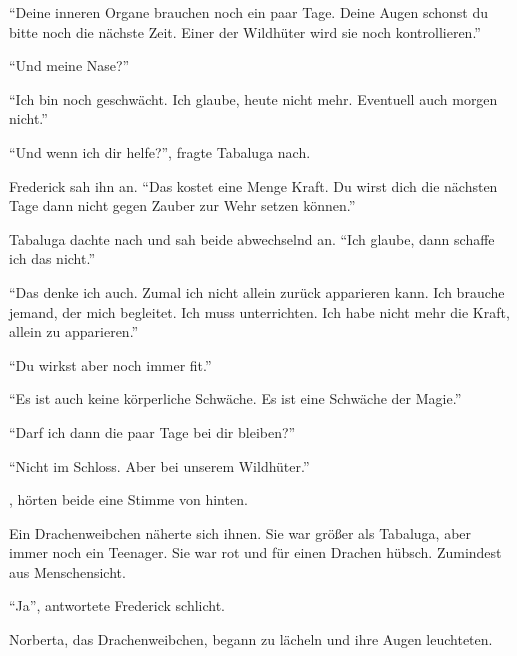 \enquote{Deine inneren Organe brauchen noch ein paar Tage. Deine Augen schonst du bitte noch die nächste Zeit. Einer der Wildhüter wird sie noch kontrollieren.}

\enquote{Und meine Nase?}

\enquote{Ich bin noch geschwächt. Ich glaube, heute nicht mehr. Eventuell auch morgen nicht.}

\enquote{Und wenn ich dir helfe?}, fragte Tabaluga nach.

Frederick sah ihn an. \enquote{Das kostet eine Menge Kraft. Du wirst dich die nächsten Tage dann nicht gegen Zauber zur Wehr setzen können.}

Tabaluga dachte nach und sah beide abwechselnd an. \enquote{Ich glaube, dann schaffe ich das nicht.}

\enquote{Das denke ich auch. Zumal ich nicht allein zurück apparieren kann. Ich brauche jemand, der mich begleitet. Ich muss unterrichten. Ich habe nicht mehr die Kraft, allein zu apparieren.}

\enquote{Du wirkst aber noch immer fit.}

\enquote{Es ist auch keine körperliche Schwäche. Es ist eine Schwäche der Magie.}

\enquote{Darf ich dann die paar Tage bei dir bleiben?}

\enquote{Nicht im Schloss. Aber bei unserem Wildhüter.}

, hörten beide eine Stimme von hinten.

Ein Drachenweibchen näherte sich ihnen. Sie war größer als Tabaluga, aber immer noch ein Teenager. Sie war rot und für einen Drachen hübsch. Zumindest aus Menschensicht.

\enquote{Ja}, antwortete Frederick schlicht.



Norberta, das Drachenweibchen, begann zu lächeln und ihre Augen leuchteten. 


